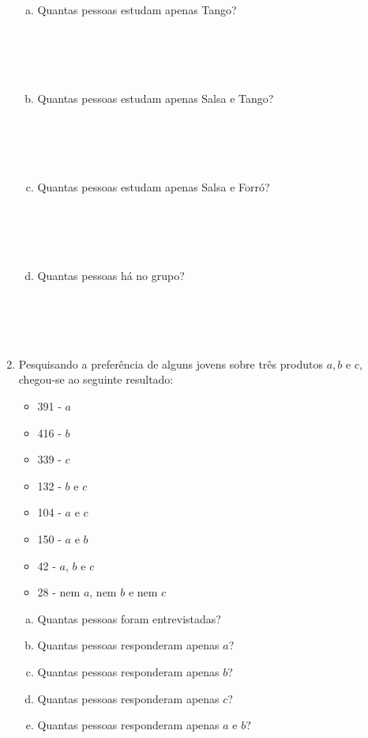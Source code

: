 \documentclass[a4paper,14pt]{article}
\begin{document}
\begin{multicols}{2}
\begin{enumerate}
\begin{enumerate}[a)]
    		\item Quantas pessoas estudam apenas Tango? \\\\\\\\\\
    		\item Quantas pessoas estudam apenas Salsa e Tango? \\\\\\\\\\
    		\item Quantas pessoas estudam apenas Salsa e Forró? \\\\\\\\\\
    		\item Quantas pessoas há no grupo? \\\\\\\\\\
    	\end{enumerate}
    	\item Pesquisando a preferência de alguns jovens sobre três produtos $a, b$ e $c$, chegou-se ao seguinte resultado: \\
    	\begin{itemize}
    		\item 391 - $a$
    		\item 416 - $b$
    		\item 339 - $c$
    		\item 132 - $b$ e $c$
    		\item 104 - $a$ e $c$
    		\item 150 - $a$ e $b$
    		\item 42 - $a$, $b$ e $c$
    		\item 28 - nem $a$, nem $b$ e nem $c$
    	\end{itemize}
    	\begin{enumerate}[a)]
    		\item Quantas pessoas foram entrevistadas?
    		\item Quantas pessoas responderam apenas $a$?
    		\item Quantas pessoas responderam apenas $b$?
    		\item Quantas pessoas responderam apenas $c$?
    		\item Quantas pessoas responderam apenas $a$ e $b$?

\end{enumerate}
\end{enumerate}
\end{multicols}
\end{document}
